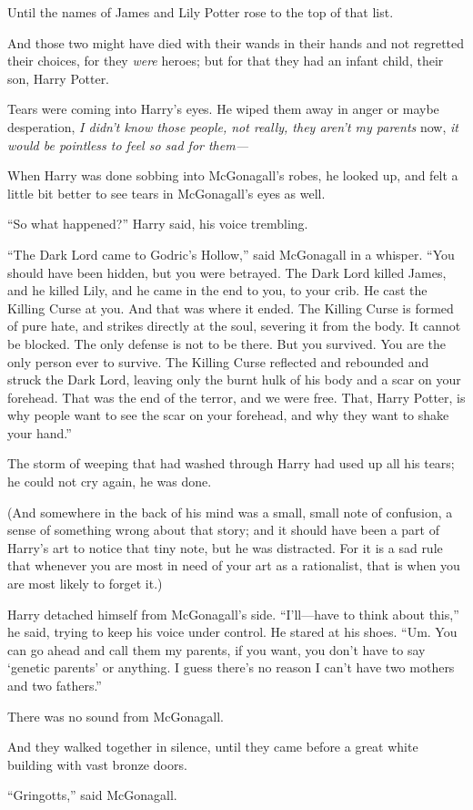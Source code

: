 Until the names of James and Lily Potter rose to the top of that list.

And those two might have died with their wands in their hands and not regretted their choices, for they \emph{were} heroes; but for that they had an infant child, their son, Harry Potter.

Tears were coming into Harry’s eyes. He wiped them away in anger or maybe desperation, \emph{I didn’t know those people, not really, they aren’t my parents} now, \emph{it would be pointless to feel so sad for them—}

When Harry was done sobbing into McGonagall’s robes, he looked up, and felt a little bit better to see tears in McGonagall’s eyes as well.

“So what happened?” Harry said, his voice trembling.

“The Dark Lord came to Godric’s Hollow,” said McGonagall in a whisper. “You should have been hidden, but you were betrayed. The Dark Lord killed James, and he killed Lily, and he came in the end to you, to your crib. He cast the Killing Curse at you. And that was where it ended. The Killing Curse is formed of pure hate, and strikes directly at the soul, severing it from the body. It cannot be blocked. The only defense is not to be there. But you survived. You are the only person ever to survive. The Killing Curse reflected and rebounded and struck the Dark Lord, leaving only the burnt hulk of his body and a scar on your forehead. That was the end of the terror, and we were free. That, Harry Potter, is why people want to see the scar on your forehead, and why they want to shake your hand.”

The storm of weeping that had washed through Harry had used up all his tears; he could not cry again, he was done.

(And somewhere in the back of his mind was a small, small note of confusion, a sense of something wrong about that story; and it should have been a part of Harry’s art to notice that tiny note, but he was distracted. For it is a sad rule that whenever you are most in need of your art as a rationalist, that is when you are most likely to forget it.)

Harry detached himself from McGonagall’s side. “I’ll—have to think about this,” he said, trying to keep his voice under control. He stared at his shoes. “Um. You can go ahead and call them my parents, if you want, you don’t have to say ‘genetic parents’ or anything. I guess there’s no reason I can’t have two mothers and two fathers.”

There was no sound from McGonagall.

And they walked together in silence, until they came before a great white building with vast bronze doors.

“Gringotts,” said McGonagall.
